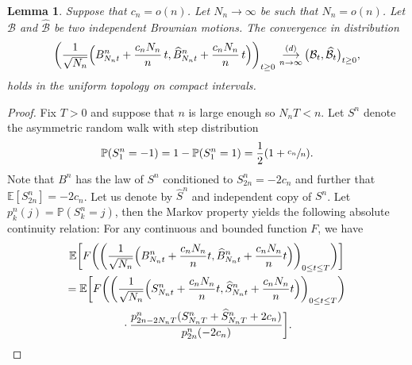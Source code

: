 \documentclass[11pt]{article}
\theoremstyle{plain}
\newtheorem{lemma}[theorem]{Lemma}
\theoremstyle{definition}
\theoremstyle{remark}
\renewcommand{\P}{\mathbb{P}}
\newcommand{\E}{\mathbb{E}}
\newcommand{\cvloi}[1][n]{\,\mathop{\longrightarrow}^{(d)}_{#1 \to \infty}\,}
\begin{document}
\begin{lemma}\label{lem:cv_recentre_brownien}
Suppose that $c_n = o(n)$. Let $N_{n}\to \infty$ be such that $N_{n} = o(n)$. Let $\mathcal{B}$ and $\widehat{ \mathcal{B}}$ be two independent Brownian motions.
The convergence in distribution\vspace*{-3pt}\enlargethispage{.5\baselineskip}%
\[
\biggl(\frac{1}{\sqrt{N_{n}}} \Bigl(B^{n}_{N_{n}t}+\frac{c_{n} N_{n}}{n}\,t, \widehat{B}^{n}_{N_{n}t}+\frac{c_{n} N_{n}}{n}\,t\Bigr)\biggr)_{t \ge 0}
\cvloi \bigl(\mathcal{B}_{t}, \widehat{ \mathcal{B}}_{t}\bigr)_{t \ge 0},
\]
holds in the uniform topology on compact intervals.
\end{lemma}

\begin{proof}
Fix $T>0$ and suppose that $n$ is large enough so $N_n T < n$. Let $S^{n}$ denote the asymmetric random walk with step distribution\vspace*{-3pt}
\[
\P(S^{n}_{1} = -1) = 1-\P(S^{n}_{1} = 1) = \frac{1}{2}(1+\sfrac{c_{n}}{n}).
\]
Note that $B^{n}$ has the law of $S^{n}$ conditioned to $S^n_{2n} = -2c_{n}$ and further that $\E[S^{n}_{2n}] = -2c_{n}$. Let us denote by $\widehat{S}^{n}$ and independent copy of $S^{n}$.
Let $p^n_k(j) = \P(S^n_k = j)$, then the Markov property yields the following absolute continuity relation: For any continuous and bounded function $F$, we have\vspace*{-5pt}
\begin{multline*}
\E\biggl[F\biggl(\biggl(\frac{1}{\sqrt{N_{n}}} \Bigl(B^{n}_{N_{n}t}+\frac{c_{n} N_{n}}{n}t, \widehat{B}^{n}_{N_{n}t}+\frac{c_{n} N_{n}}{n}t\Bigr)\biggr)_{0 \le t \le T}\biggr) \biggr]
\\
= \E\biggl[F\biggl(\biggl(\frac{1}{\sqrt{N_{n}}} \Bigl(S^{n}_{N_{n}t}+\frac{c_{n} N_{n}}{n}t, \widehat{S}^{n}_{N_{n}t}+\frac{c_{n} N_{n}}{n}t\Bigr)\biggr)_{0 \le t \le T}\biggr)\\
{}\cdot\frac{p^n_{2n-2N_{n}T}(S^{n}_{N_{n}T}+\widehat{S}^{n}_{N_{n}T}+2c_{n})}{p^n_{2n}(-2c_{n})}\biggr].
\end{multline*}


\end{proof}
\end{document}
